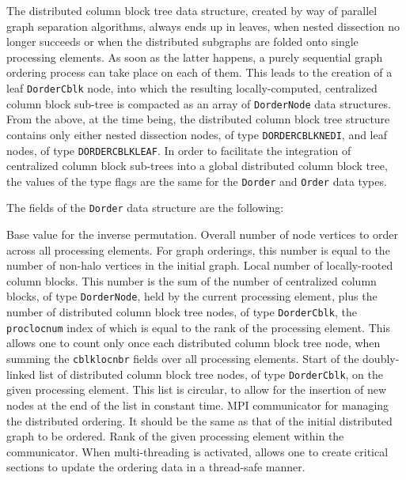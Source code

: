 The distributed column block tree data structure, created by way of
parallel graph separation algorithms, always ends up in leaves, when
nested dissection no longer succeeds or when the distributed subgraphs
are folded onto single processing elements. As soon as the latter
happens, a purely sequential graph ordering process can take place on
each of them. This leads to the creation of a leaf
\texttt{Dorder\lbt Cblk} node, into which the resulting
locally-computed, centralized column block sub-tree is compacted as an
array of \texttt{Dorder\lbt Node} data structures. From the above, at
the time being, the distributed column block tree structure contains
only either nested dissection nodes, of type
\texttt{DORDER\lbt CBLK\lbt NEDI}, and leaf nodes, of type 
\texttt{DORDER\lbt CBLK\lbt LEAF}. In order to facilitate the
integration of centralized column block sub-trees into a global
distributed column block tree, the values of the type flags are the
same for the \texttt{Dorder} and \texttt{Order} data types.

The fields of the \texttt{Dorder} data structure are the following:
\begin{itemize}
  Base value for the inverse permutation.
  Overall number of node vertices to order across all processing
  elements. For graph orderings, this number is equal to the number of
  non-halo vertices in the initial graph.
  Local number of locally-rooted column blocks. This number is the sum
  of the number of centralized column blocks, of type
  \texttt{Dorder\lbt Node}, held by the current processing element,
  plus the number of distributed column block tree nodes, of type
  \texttt{Dorder\lbt Cblk}, the \texttt{proc\lbt loc\lbt num} index of
  which is equal to the rank of the processing element. This allows
  one to count only once each distributed column block tree node, when
  summing the \texttt{cblk\lbt loc\lbt nbr} fields over all
  processing elements.
  Start of the doubly-linked list of distributed column block tree
  nodes, of type \texttt{Dorder\lbt Cblk}, on the given processing
  element. This list is circular, to allow for the insertion of new
  nodes at the end of the list in constant time.
  MPI communicator for managing the distributed ordering. It should be
  the same as that of the initial distributed graph to be ordered.
  Rank of the given processing element within the communicator.
  When multi-threading is activated, allows one to create critical
  sections to update the ordering data in a thread-safe manner.
\end{itemize}

